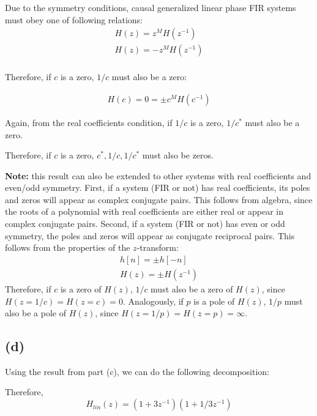 \documentclass{article}
\begin{document}
Due to the symmetry conditions, causal generalized linear phase FIR systems must obey one of following relations:
\begin{align*}
H(z) = z^MH(z^{-1}) \tag{if even symmetric} \\
H(z) = -z^MH(z^{-1}) \tag{if odd symmetric} \\
\end{align*}

Therefore, if $c$ is a zero, $1/c$ must also be a zero:

\begin{align*}
H(c) = 0 = \pm c^MH(c^{-1})
\end{align*}

Again, from the real coefficients condition, if $1/c$ is a zero, $1/c^*$ must also be a zero.

Therefore, if $c$ is a zero, $c^*, 1/c, 1/c^*$ must also be zeros.

\noindent\textbf{Note:} this result can also be extended to other systems with real coefficients and even/odd symmetry. First, if a system (FIR or not) has real coefficients, its poles and zeros will appear as complex conjugate pairs. This follows from algebra, since the roots of a polynomial with real coefficients are either real or appear in complex conjugate pairs. Second, if a system (FIR or not) has even or odd symmetry, the poles and zeros will appear as conjugate reciprocal pairs. This follows from the properties of the $z$-transform:
\begin{align}
h[n] = \pm h[-n] \tag{even or odd symmetry} \\
H(z) = \pm H(z^{-1}) \tag{time reversal property of the $z$-transform}
\end{align}
Therefore, if $c$ is a zero of $H(z)$, $1/c$ must also be a zero of $H(z)$, since $H(z = 1/c) = H(z = c) = 0$. Analogously, if $p$ is a pole of $H(z)$, $1/p$ must also be a pole of $H(z)$, since $H(z = 1/p) = H(z = p) = \infty$.

\subsection{(d)}

Using the result from part (c), we can do the following decomposition:

\begin{figure}[!h]
	\resizebox{0.9\textwidth}{!}{}
\end{figure}

Therefore,
\begin{equation}
H_{lin}(z) = (1 + 3z^{-1})(1 +1/3z^{-1})
\end{equation}
\end{document}
